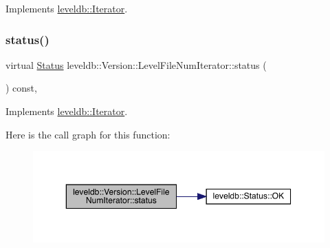 Implements \mbox{\hyperlink{classleveldb_1_1_iterator_a8ad637f0a759e6d94cca6c5b4db440d3}{leveldb\+::\+Iterator}}.

\mbox{\label{classleveldb_1_1_version_1_1_level_file_num_iterator_a173217ee0e689944ba052b1d07d2e58a}} 
\subsubsection{\texorpdfstring{status()}{status()}}
{\footnotesize\ttfamily virtual \mbox{\hyperlink{classleveldb_1_1_status}{Status}} leveldb\+::\+Version\+::\+Level\+File\+Num\+Iterator\+::status (\begin{DoxyParamCaption}{ }\end{DoxyParamCaption}) const\hspace{0.3cm}{\ttfamily [inline]}, {\ttfamily [virtual]}}



Implements \mbox{\hyperlink{classleveldb_1_1_iterator_ac84f34623a031b7eeb23409320f76376}{leveldb\+::\+Iterator}}.

Here is the call graph for this function\+:
\nopagebreak
\begin{figure}[H]
\begin{center}
\leavevmode
\includegraphics[width=350pt]{classleveldb_1_1_version_1_1_level_file_num_iterator_a173217ee0e689944ba052b1d07d2e58a_cgraph}
\end{center}
\end{figure}
\mbox{\label{classleveldb_1_1_version_1_1_level_file_num_iterator_a9bf0e045961ed325d37bfaa8b2c77e8b}} 
